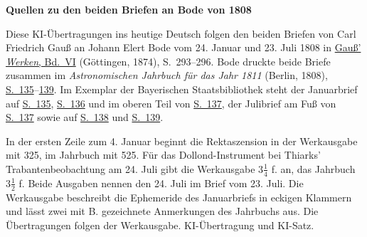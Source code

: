 \clearpage\thispagestyle{empty}
\begin{center}\textbf{Quellen zu den beiden Briefen an Bode von 1808}\end{center}
\noindent Diese KI-Übertragungen ins heutige Deutsch folgen den beiden Briefen von Carl Friedrich Gauß an Johann Elert Bode vom 24. Januar und 23. Juli 1808 in \href{https://gdz.sub.uni-goettingen.de/id/PPN236007467}{Gauß’ \textit{Werken}, Bd.~VI} (Göttingen, 1874), S.~293--296. Bode druckte beide Briefe zusammen im \textit{Astronomischen Jahrbuch für das Jahr 1811} (Berlin, 1808), \href{https://www.digitale-sammlungen.de/en/view/bsb10538340?page=147}{S.~135}--\href{https://www.digitale-sammlungen.de/en/view/bsb10538340?page=151}{139}. Im Exemplar der Bayerischen Staatsbibliothek steht der Januarbrief auf \href{https://www.digitale-sammlungen.de/en/view/bsb10538340?page=147}{S.~135}, \href{https://www.digitale-sammlungen.de/en/view/bsb10538340?page=148}{S.~136} und im oberen Teil von \href{https://www.digitale-sammlungen.de/en/view/bsb10538340?page=149}{S.~137}, der Julibrief am Fuß von \href{https://www.digitale-sammlungen.de/en/view/bsb10538340?page=149}{S.~137} sowie auf \href{https://www.digitale-sammlungen.de/en/view/bsb10538340?page=150}{S.~138} und \href{https://www.digitale-sammlungen.de/en/view/bsb10538340?page=151}{S.~139}.
\par\medskip
In der ersten Zeile zum 4. Januar beginnt die Rektaszension in der Werkausgabe mit 325, im Jahrbuch mit 525. Für das Dollond-Instrument bei Thiarks’ Trabantenbeobachtung am 24. Juli gibt die Werkausgabe $3\tfrac14$ f. an, das Jahrbuch $3\tfrac12$ f. Beide Ausgaben nennen den 24. Juli im Brief vom 23. Juli. Die Werkausgabe beschreibt die Ephemeride des Januarbriefs in eckigen Klammern und lässt zwei mit B. gezeichnete Anmerkungen des Jahrbuchs aus. Die Übertragungen folgen der Werkausgabe. KI-Übertragung und KI-Satz.
\clearpage
